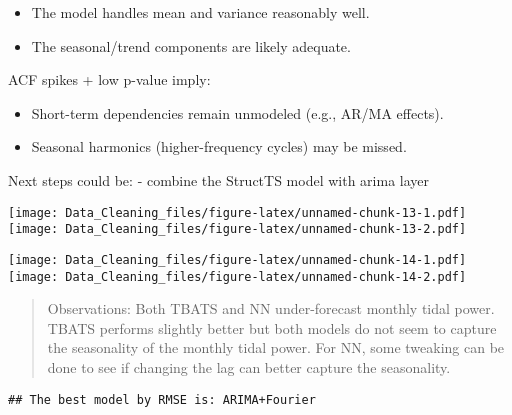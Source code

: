 \documentclass[
]{article}
\begin{document}
\begin{itemize}
\item
  The model handles mean and variance reasonably well.
\item
  The seasonal/trend components are likely adequate.
\end{itemize}

ACF spikes + low p-value imply:

\begin{itemize}
\item
  Short-term dependencies remain unmodeled (e.g., AR/MA effects).
\item
  Seasonal harmonics (higher-frequency cycles) may be missed.
\end{itemize}

Next steps could be: - combine the StructTS model with arima layer

\texttt{[image: Data\_Cleaning\_files/figure-latex/unnamed-chunk-13-1.pdf]}
\texttt{[image: Data\_Cleaning\_files/figure-latex/unnamed-chunk-13-2.pdf]}

\texttt{[image: Data\_Cleaning\_files/figure-latex/unnamed-chunk-14-1.pdf]}
\texttt{[image: Data\_Cleaning\_files/figure-latex/unnamed-chunk-14-2.pdf]}

\begin{quote}
Observations: Both TBATS and NN under-forecast monthly tidal power.
TBATS performs slightly better but both models do not seem to capture
the seasonality of the monthly tidal power. For NN, some tweaking can be
done to see if changing the lag can better capture the seasonality.
\end{quote}

\begin{verbatim}
## The best model by RMSE is: ARIMA+Fourier
\end{verbatim}
\end{document}
